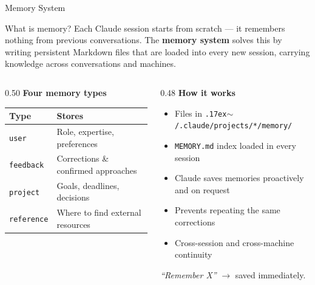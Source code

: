 \documentclass[aspectratio=169, 10pt]{beamer}
\begin{document}
\begin{frame}{Memory System}
  \begin{block}{What is memory?}
    \small Each Claude session starts from scratch --- it remembers nothing from previous conversations. The \textbf{memory system} solves this by writing persistent Markdown files that are loaded into every new session, carrying knowledge across conversations and machines.
  \end{block}
  \vspace{0.4em}
  \begin{columns}[T]
    \begin{column}{0.50\textwidth}
      \textbf{\color{biokteal}Four memory types}
      \medskip

      \renewcommand{\arraystretch}{1.2}
      \begin{tabular}{@{}ll@{}}
        \toprule
        \textbf{Type} & \textbf{Stores} \\
        \midrule
        \texttt{user}      & Role, expertise, preferences \\
        \texttt{feedback}  & Corrections \& confirmed approaches \\
        \texttt{project}   & Goals, deadlines, decisions \\
        \texttt{reference} & Where to find external resources \\
        \bottomrule
      \end{tabular}
    \end{column}
    \begin{column}{0.48\textwidth}
      \textbf{\color{biokteal}How it works}
      \begin{itemize}\setlength\itemsep{4pt}
        \item Files in \texttt{{\raise.17ex\hbox{$\scriptstyle\sim$}}/.claude/projects/*/memory/}
        \item \texttt{MEMORY.md} index loaded in every session
        \item Claude saves memories proactively and on request
        \item Prevents repeating the same corrections
        \item Cross-session and cross-machine continuity
      \end{itemize}
      \vspace{0.5em}
      \begin{block}{}
        \small\centering
        \textit{``Remember X''} $\to$ saved immediately.\\

\end{block}
\end{column}
\end{columns}
\end{frame}
\end{document}
